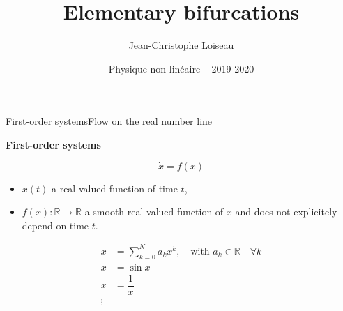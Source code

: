 \documentclass[usenames,dvipsnames,svgnames,10pt,aspectratio=169]{beamer}
\title[Nonlinear physics] %
{
	Elementary bifurcations
}
\author[J.-Ch.~Loiseau] %
{
	\underline{Jean-Christophe Loiseau}
}
\institute[unused]
{
	\url{jean-christophe.loiseau@ensam.eu} \\
	Laboratoire DynFluid \\
	Arts et M\'etiers, France.
}
\date[unused]{Physique non-lin\'eaire -- 2019-2020}
\begin{document}
\titleframe	%


\begin{frame}[t, c]{First-order systems}{Flow on the real number line}
  \begin{minipage}{.48\textwidth}
    \begin{block}{\centering \textbf{First-order systems}}

    \[ \dot{x} = f(x) \]
    \end{block}

    \medskip

    \begin{itemize}
    \item $x(t)$ a real-valued function of time $t$,

      \medskip

    \item $f(x) : \mathbb{R} \to \mathbb{R}$ a smooth real-valued function of $x$ and does not explicitely depend on time $t$.
    \end{itemize}
  \end{minipage}%
  \hfill
  \begin{minipage}{.48\textwidth}
    \[
    \begin{aligned}
      \dot{x} & = \sum_{k=0}^N a_k x^k, \quad \text{with } a_k \in \mathbb{R} \quad \forall k \\
      \dot{x} & = \sin x \\
      \dot{x} & = \dfrac{1}{x} \\
      \vdots
    \end{aligned}
    \]
  \end{minipage}

  \vspace{1cm}
\end{frame}
\end{document}

